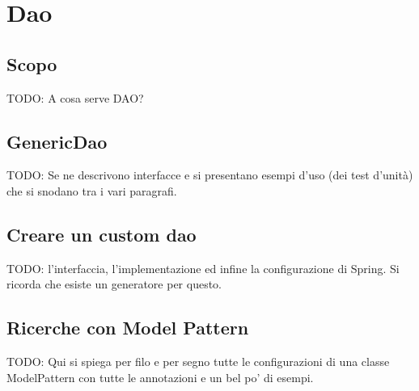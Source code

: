 \chapter{Dao}

\section{Scopo}
TODO: A cosa serve DAO?

\section{GenericDao}
TODO: Se ne descrivono interfacce e si presentano esempi d'uso (dei test d'unità) che si snodano tra i vari paragrafi.

\section{Creare un custom dao}
TODO: l'interfaccia, l'implementazione ed infine la configurazione di Spring. Si ricorda che esiste un generatore per questo.

\section{Ricerche con Model Pattern}
TODO: Qui si spiega per filo e per segno tutte le configurazioni di una classe ModelPattern con tutte le annotazioni e un bel po' di esempi.